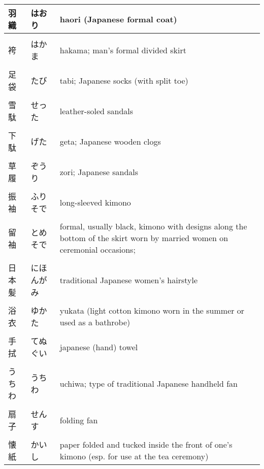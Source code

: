 \documentclass{article}
\begin{document}
\begin{tabular}{ l | l | p{11.5cm} }
羽織 & はおり &haori (Japanese formal coat) \\ \hline \\[-1em]
袴 & はかま & hakama; man's formal divided skirt \\ \hline \\[-1em]
足袋 & たび & tabi; Japanese socks (with split toe) \\ \hline \\[-1em]
雪駄 & せった & leather-soled sandals \\ \hline \\[-1em]
下駄 & げた & geta; Japanese wooden clogs \\ \hline \\[-1em]
草履 & ぞうり & zori; Japanese sandals \\ \hline \\[-1em]
振袖 & ふりそで & long-sleeved kimono \\ \hline \\[-1em]
留袖 & とめそで & formal, usually black, kimono with designs along the bottom of the skirt worn by married women on ceremonial occasions; \\ \hline \\[-1em]
日本髪 &にほんがみ&traditional Japanese women's hairstyle \\ \hline \\[-1em]
浴衣 & ゆかた & yukata (light cotton kimono worn in the summer or used as a bathrobe) \\ \hline \\[-1em]
手拭 & てぬぐい & japanese (hand) towel \\ \hline \\[-1em]
うちわ & うちわ &  uchiwa; type of traditional Japanese handheld fan  \\ \hline \\[-1em]
扇子 &  せんす  & folding fan \\ \hline \\[-1em]
懐紙 &  かいし & paper folded and tucked inside the front of one's kimono (esp. for use at the tea ceremony) %
\end{tabular}
\end{document}

